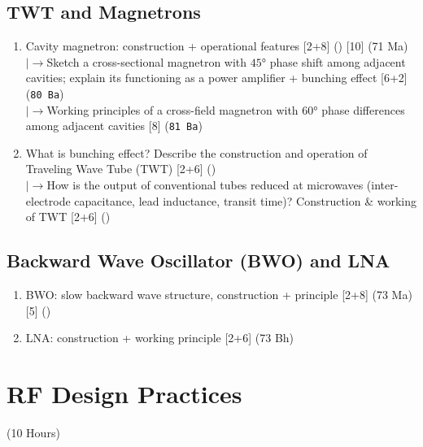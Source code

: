 \documentclass[12pt]{article}
\newcommand{\lb}{\\$\left|\rightarrow\right.$}
\begin{document}
  \subsection{TWT and Magnetrons}
    \begin{enumerate}[topsep=0pt, noitemsep]
      \item Cavity magnetron: construction + operational features \hfill [2+8] () [10] (71 Ma)
        \lb Sketch a cross-sectional magnetron with $45°$ phase shift among adjacent cavities; explain its functioning as a power amplifier + bunching effect \hfill [6+2] (\texttt{80 Ba})
        \lb Working principles of a cross-field magnetron with $60°$ phase differences among adjacent cavities \hfill [8] (\texttt{81 Ba})
      \item What is bunching effect? Describe the construction and operation of Traveling Wave Tube (TWT) \hfill [2+6] ()
        \lb How is the output of conventional tubes reduced at microwaves (inter-electrode capacitance, lead inductance, transit time)? Construction \& working of TWT \hfill [2+6] ()
    \end{enumerate}

  \subsection{Backward Wave Oscillator (BWO) and LNA}
    \begin{enumerate}[topsep=0pt, noitemsep]
      \item BWO: slow backward wave structure, construction + principle \hfill [2+8] (73 Ma) [5] ()
      \item LNA: construction + working principle \hfill [2+6] (73 Bh)
    \end{enumerate}

\pagebreak
\section{RF Design Practices}
\begin{center}(10 Hours)\end{center}
\end{document}
